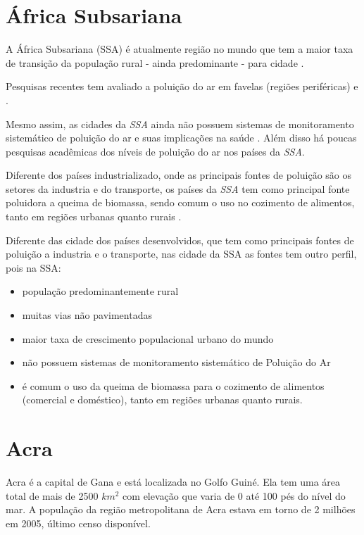 \section{África Subsariana}

A África Subsariana (SSA) é atualmente região no mundo que tem a maior taxa de 
transição da população rural - ainda predominante - para cidade 
\citep{MONTGOMERY2008}.

Pesquisas recentes tem avaliado a poluição do ar em favelas 
(regiões periféricas) \citep{SCLAR2005} e \citep{RILEY2007}. 

Mesmo assim, as cidades da \textit{SSA} ainda não possuem sistemas de 
monitoramento sistemático de poluição do ar e suas implicações na saúde 
\citep{EZZATI2004}. 
Além disso há poucas pesquisas acadêmicas dos níveis de poluição do ar nos 
países da \textit{SSA}.

Diferente dos países industrializado, onde as principais fontes de poluição 
são os setores da industria e do transporte, os países da \textit{SSA} tem como 
principal fonte poluidora a queima de biomassa, sendo comum o uso no cozimento 
de alimentos, tanto em regiões urbanas quanto rurais \citep{SMITH2004}.

Diferente das cidade dos países desenvolvidos, que tem como principais 
fontes de poluição a industria e o transporte, nas cidade da SSA as fontes 
tem outro perfil, pois na SSA:
  \begin{itemize}
    \item população predominantemente rural
    \item muitas vias não pavimentadas
    \item maior taxa de crescimento populacional urbano do mundo
    \item não possuem sistemas de monitoramento sistemático de Poluição do Ar
    \item é comum o uso da queima de biomassa para o cozimento de alimentos  
          (comercial e doméstico), tanto em regiões urbanas quanto rurais.
  \end{itemize}

\section{Acra}

Acra é a capital  de Gana e está localizada no Golfo Guiné. Ela tem uma área 
total de mais de 2500 $km^2$ com elevação que varia de 0 até 100 pés do nível 
do mar. 
A população da região metropolitana de Acra estava em torno de 2 milhões em 2005, 
último censo disponível.

